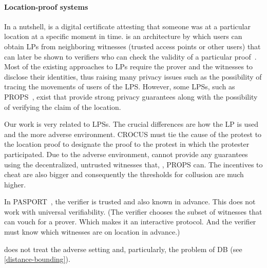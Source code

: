 \paragraph{Location-proof systems}%
\label{location-proof-systems}

In a nutshell,  is a digital certificate attesting that someone was at 
a particular location at a specific moment in time.
 is an architecture by which users can obtain \acp{LP} from 
neighboring witnesses (\eg trusted access points or other users) that can later 
be shown to verifiers who can check the validity of a particular 
proof~\cite{luo2010veriplace,zhu2011applaus}.
Most of the existing approaches to \acp{LP} require the prover and the 
witnesses to disclose their identities, thus raising many privacy issues such 
as the possibility of tracing the movements of users of the \ac{LPS}.
However, some \acp{LPS}, such as PROPS~\cite{PROPS}, exist that provide strong 
privacy guarantees along with the possibility of verifying the claim of the 
location.

Our work is very related to \acp{LPS}.
The crucial differences are how the \ac{LP} is used and the more adverse 
environment.
CROCUS must tie the cause of the protest to the location proof to designate the 
proof to the protest in which the protester participated.
Due to the adverse environment, \CROCUS cannot provide any guarantees using the 
decentralized, untrusted witnesses that, \eg, PROPS can.
The incentives to cheat are also bigger and consequently the thresholds for 
collusion are much higher.

In PASPORT~\cite{PASPORT}, the verifier is trusted and also known in advance.
This does not work with universal verifiability.
(The verifier chooses the subset of witnesses that can vouch for a prover. 
Which makes it an interactive protocol. And the verifier must know which 
witnesses are on location in advance.)

\Textcite{ProofOfWitnessPresence} does not treat the adverse setting and, 
particularly, the problem of \ac{DB} (see \cref{distance-bounding}).
